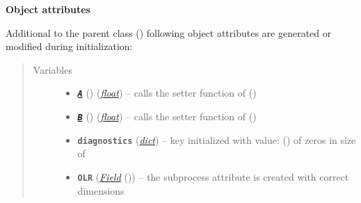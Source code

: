 \documentclass[a4paper,10pt,english]{sphinxmanual}
\begin{document}
\begin{fulllineitems}
\begin{quote}
\begin{description}
\begin{itemize}
\begin{itemize}
\end{itemize}


\end{itemize}

\end{description}\end{quote}

\textbf{Object attributes}

Additional to the parent class {\hyperref[api/climlab.process:climlab.process.energy_budget.EnergyBudget]{\emph{}}} ()
following object attributes are generated or modified during initialization:
\begin{quote}\begin{description}
\item[{Variables}] \leavevmode\begin{itemize}
\item {} 
{\hyperref[api/climlab.radiation:climlab.radiation.AplusBT.AplusBT.A]{\emph{\textbf{\texttt{A}}}}} () (\href{http://docs.python.org/2.7/library/functions.html\#float}{\emph{float}}) -- calls the setter function of {\hyperref[api/climlab.radiation:climlab.radiation.AplusBT.AplusBT.A]{\emph{}}} ()

\item {} 
{\hyperref[api/climlab.radiation:climlab.radiation.AplusBT.AplusBT.B]{\emph{\textbf{\texttt{B}}}}} () (\href{http://docs.python.org/2.7/library/functions.html\#float}{\emph{float}}) -- calls the setter function of {\hyperref[api/climlab.radiation:climlab.radiation.AplusBT.AplusBT.B]{\emph{}}} ()

\item {} 
\textbf{\texttt{diagnostics}} (\href{http://docs.python.org/2.7/library/stdtypes.html\#dict}{\emph{dict}}) -- key  initialized with value:
{\hyperref[api/climlab.domain:climlab.domain.field.Field]{\emph{}}} () of zeros
in size of 

\item {} 
\textbf{\texttt{OLR}} ({\hyperref[api/climlab.domain:climlab.domain.field.Field]{\emph{\emph{Field}}}} ()) -- the subprocess attribute  is
created with correct dimensions


\end{itemize}
\end{description}
\end{quote}
\end{fulllineitems}
\end{document}
